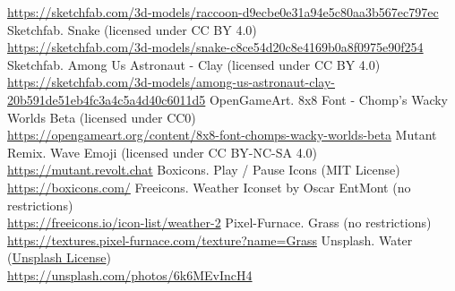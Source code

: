 \documentclass{article}
\begin{document}
\begin{thebibliography}{9}
        \url{https://sketchfab.com/3d-models/raccoon-d9ecbe0e31a94e5c80aa3b567ec797ec}
        Sketchfab. Snake (licensed under CC BY 4.0) \\
        \url{https://sketchfab.com/3d-models/snake-c8ce54d20c8e4169b0a8f0975e90f254}
        Sketchfab. Among Us Astronaut - Clay (licensed under CC BY 4.0) \\
        \url{https://sketchfab.com/3d-models/among-us-astronaut-clay-20b591de51eb4fc3a4c5a4d40c6011d5}
        OpenGameArt. 8x8 Font - Chomp's Wacky Worlds Beta (licensed under CC0) \\
        \url{https://opengameart.org/content/8x8-font-chomps-wacky-worlds-beta}
        Mutant Remix. Wave Emoji (licensed under CC BY-NC-SA 4.0) \\
        \url{https://mutant.revolt.chat}
        Boxicons. Play / Pause Icons (MIT License) \\
        \url{https://boxicons.com/}
        Freeicons. Weather Iconset by Oscar EntMont (no restrictions) \\
        \url{https://freeicons.io/icon-list/weather-2}
        Pixel-Furnace. Grass (no restrictions) \\
        \url{https://textures.pixel-furnace.com/texture?name=Grass}
        Unsplash. Water (\href{https://unsplash.com/license}{Unsplash License}) \\
        \url{https://unsplash.com/photos/6k6MEvIncH4}
    \end{thebibliography}
    
    \newpage
\end{document}
